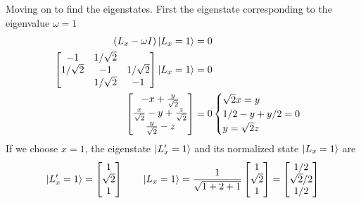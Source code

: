 \documentclass[../../../main.tex]{subfiles}
\begin{document}
Moving on to find the eigenstates.
First the eigenstate corresponding to the eigenvalue $\omega=1$
\begin{align*}
    \left( L_x -\omega I  \right) \ket{L_x=1}&= 0\\
    \begin{bmatrix}
        -1 & 1/\sqrt{2 }& \\
        1/\sqrt{2}&-1 &1/\sqrt{2} \\
        & 1/\sqrt{2}&-1 \\
    \end{bmatrix}
    \ket{L_x=1}&= 0\\
    \begin{bmatrix}
        -x+\frac{y }{\sqrt{2 }}\\
        \frac{x }{\sqrt{2 }}-y +\frac{z }{\sqrt{2 }}\\
        \frac{y }{\sqrt{2 }}-z
    \end{bmatrix}
    &= 0
    \begin{cases}
        \sqrt{2 }x=y\\
        1/2-y+y/2=0\\
        y=\sqrt{2 }z
    \end{cases}
\end{align*}
If we choose $x=1$, the eigenstate $\ket{L_x'=1}$ and its normalized state $\ket{L_x=1}$ are 
\begin{equation*}
    \ket{L_x'=1}=
    \begin{bmatrix}
        1\\
        \sqrt{2}\\
        1\\
    \end{bmatrix}
    \qquad
    \ket{L_x=1}=
    \frac{1}{\sqrt{1+2+1}}
    \begin{bmatrix}
        1\\
        \sqrt{2}\\
        1\\
    \end{bmatrix}
    =
        \begin{bmatrix}
        1/2\\
        \sqrt{2}/2\\
        1/2\\
    \end{bmatrix}
\end{equation*}
\end{document}
